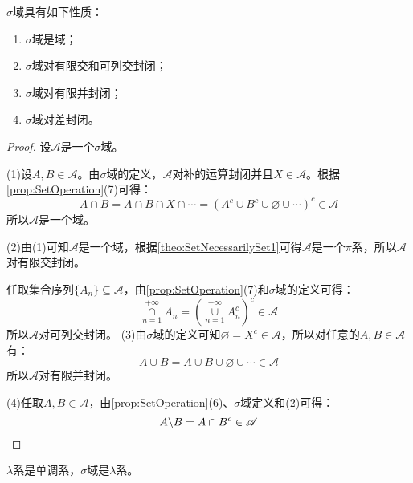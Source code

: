 \begin{property}\label{prop:SigmaField}
	$\sigma$域具有如下性质：
	\begin{enumerate}
		\item $\sigma$域是域；
		\item $\sigma$域对有限交和可列交封闭；
		\item $\sigma$域对有限并封闭；
		\item $\sigma$域对差封闭。
	\end{enumerate}
\end{property}
\begin{proof}
	设$\mathscr{A}$是一个$\sigma$域。\par
	(1)设$A,B\in\mathscr{A}$。由$\sigma$域的定义，$\mathscr{A}$对补的运算封闭并且$X\in\mathscr{A}$。根据\cref{prop:SetOperation}(7)可得：
	\begin{equation*}
		A\cap B=A\cap B\cap X\cap\cdots=(A^c\cup B^c\cup\varnothing\cup\cdots)^c\in\mathscr{A}
	\end{equation*}
	所以$\mathscr{A}$是一个域。\par
	(2)由(1)可知$\mathscr{A}$是一个域，根据\cref{theo:SetNecessarilySet1}可得$\mathscr{A}$是一个$\pi$系，所以$\mathscr{A}$对有限交封闭。\par
	任取集合序列$\{A_n\}\subseteq\mathscr{A}$，由\cref{prop:SetOperation}(7)和$\sigma$域的定义可得：
	\begin{equation*}
		\underset{n=1}{\overset{+\infty}{\cap}}A_n=\left(\underset{n=1}{\overset{+\infty}{\cup}}A_n^c\right)^c\in\mathscr{A}
	\end{equation*}
	所以$\mathscr{A}$对可列交封闭。
	(3)由$\sigma$域的定义可知$\varnothing=X^c\in\mathscr{A}$，所以对任意的$A,B\in\mathscr{A}$有：
	\begin{equation*}
		A\cup B=A\cup B\cup\varnothing\cup\cdots\in\mathscr{A}
	\end{equation*}
	所以$\mathscr{A}$对有限并封闭。\par
	(4)任取$A,B\in\mathscr{A}$，由\cref{prop:SetOperation}(6)、$\sigma$域定义和(2)可得：
	\begin{equation*}
		A\backslash B=A\cap B^c\in\mathscr{A}\qedhere
	\end{equation*}
\end{proof}
\begin{theorem}\label{theo:SetNecessarilySet2}
	$\lambda$系是单调系，$\sigma$域是$\lambda$系。
\end{theorem}
